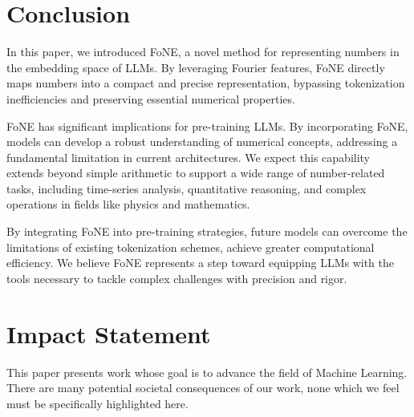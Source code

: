 \vspace{-2mm}
\section{Conclusion}
In this paper, we introduced FoNE, a novel method for representing numbers in the embedding space of LLMs. By leveraging Fourier features, FoNE directly maps numbers into a compact and precise representation, bypassing tokenization inefficiencies and preserving essential numerical properties.

FoNE has significant implications for pre-training LLMs. By incorporating FoNE, models can develop a robust understanding of numerical concepts, addressing a fundamental limitation in current architectures. We expect this capability extends beyond simple arithmetic to support a wide range of number-related tasks, including time-series analysis, quantitative reasoning, and complex operations in fields like physics and mathematics.

By integrating FoNE into pre-training strategies, future models can overcome the limitations of existing tokenization schemes, achieve greater computational efficiency. We believe FoNE represents a  step toward equipping LLMs with the tools necessary to tackle complex challenges with precision and rigor.


\ifdefined\isarxiv
\else
\section*{Impact Statement}
This paper presents work whose goal is to advance the field of Machine Learning. There are many potential societal consequences of our work, none which we feel must be specifically highlighted here.
\fi